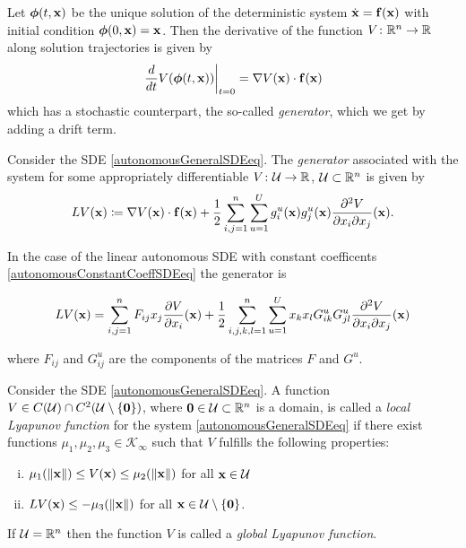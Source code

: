 \documentclass[a4paper,12pt,twoside,BCOR=10mm]{scrbook}
\begin{document}
Let $\bm{\phi}(t,\mathbf{x})$ be the unique solution of the deterministic system $\Dot{\mathbf{x}} = \mathbf{f}(\mathbf{x})$ with initial condition $\bm{\phi}(0, \mathbf{x}) = \mathbf{x}$. Then the derivative of the function $V \colon \mathbb{R}^{n} \to \mathbb{R}^{}$ along solution trajectories is given by
\begin{align*}
    \left. \frac{d}{dt}V(\bm{\phi}(t,\mathbf{x}))\right\rvert_{t = 0} = \nabla V(\mathbf{x})\cdot \mathbf{f}(\mathbf{x})
\end{align*}
which has a stochastic counterpart, the so-called \textit{generator}, which we get by adding a drift term.

\begin{definition}
    Consider the SDE \eqref{autonomousGeneralSDEeq}. The \textit{generator} associated with the system for some appropriately differentiable $V \colon \mathcal{U} \to \mathbb{R}^{}$, $\mathcal{U} \subset \mathbb{R}^{n}$ is given by
    \begin{align}
        LV(\mathbf{x}) \coloneqq \nabla V(\mathbf{x})\cdot \mathbf{f}(\mathbf{x}) + \frac{1}{2}\sum\limits_{i,j = 1}^n\sum\limits_{u = 1}^U g_i^u(\mathbf{x}) g_j^u(\mathbf{x}) \frac{\partial^2 V}{\partial x_i \partial x_j}(\mathbf{x}).
    \end{align}
\end{definition}

In the case of the linear autonomous SDE with constant coefficents \eqref{autonomousConstantCoeffSDEeq} the generator is

\begin{align}
    LV(\mathbf{x}) = \sum\limits_{i,j = 1}^nF_{ij}x_j\frac{\partial V}{\partial x_i}(\mathbf{x}) + \frac{1}{2}\sum\limits_{i,j,k,l = 1}^n\sum\limits_{u = 1}^Ux_k x_l G_{ik}^u G_{jl}^u \frac{\partial^2 V}{\partial x_i \partial x_j}(\mathbf{x})
\end{align}

where $F_{ij}$ and $G_{ij}^u$ are the components of the matrices $F$ and $G^u$.

\begin{definition}
    Consider the SDE \eqref{autonomousGeneralSDEeq}. A function $V\in C(\mathcal{U})\cap C^2(\mathcal{U}\setminus \{\mathbf{0}\})$, where $\mathbf{0} \in \mathcal{U} \subset \mathbb{R}^{n}$ is a domain, is called a \textit{local Lyapunov function} for the system \eqref{autonomousGeneralSDEeq} if there exist functions $\mu_1, \mu_2, \mu_3 \in \mathcal{K}_\infty$ such that $V$ fulfills the following properties:
    \begin{enumerate}[i)]
        \item $\mu_1(\left\lVert\mathbf{x}\right\rVert) \leq V(\mathbf{x}) \leq \mu_2(\left\lVert\mathbf{x}\right\rVert)$ for all $\mathbf{x}\in \mathcal{U}$
        \item $LV(\mathbf{x}) \leq -\mu_3(\left\lVert\mathbf{x}\right\rVert)$ for all $\mathbf{x} \in \mathcal{U}\setminus \{\mathbf{0}\}$.
    \end{enumerate}
    If $\mathcal{U} = \mathbb{R}^{n}$ then the function $V$ is called a \textit{global Lyapunov function}.
\end{definition}
\end{document}
